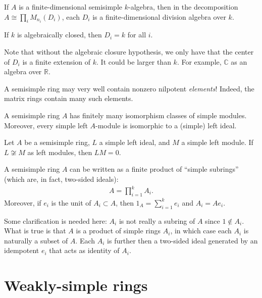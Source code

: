 \documentclass[12pt]{article}
\begin{document}
\begin{thm}
	If $A$ is a finite-dimensional semisimple $k$-algebra, 
	then in the decomposition $A \cong \prod_{i} M_{n_{i}}(D_{i})$, 
	each $D_{i}$ is a finite-dimensional division algebra over $k$.

	If $k$ is algebraically closed, then $D_{i} = k$ for all $i$.
\end{thm}
Note that without the algebraic closure hypothesis, we only have that the center of $D_{i}$ is a finite extension of $k$. 
It could be larger than $k$. 
For example, $\mathbb{C}$ as an algebra over $\mathbb{R}$.

\begin{rem}
	A semisimple ring may very well contain nonzero nilpotent \emph{elements}! 
	Indeed, the matrix rings contain many such elements.
\end{rem}

\begin{thm} \label{thm:semisimple-finitely-many-simples}
	A semisimple ring $A$ has finitely many isomorphism classes of simple modules. 
	Moreover, every simple left $A$-module is isomorphic to a (simple) left ideal.
\end{thm}

\begin{thm}
	Let $A$ be a semisimple ring, $L$ a simple left ideal, and $M$ a simple left module. 
	If $L \not\cong M$ as left modules, then $LM = 0$.
\end{thm}

\begin{thm}
	A semisimple ring $A$ can be written as a finite product of ``simple subrings'' (which are, in fact, two-sided ideals):
	\begin{align*} 
		A = \prod_{i = 1}^{k} A_{i}.
	\end{align*}
	Moreover, if $e_{i}$ is the unit of $A_{i} \subset A$, then $1_{A} = \sum_{i = 1}^{k} e_{i}$ and $A_{i} = A e_{i}$.
\end{thm}
Some clarification is needed here: $A_{i}$ is not really a subring of $A$ since $1 \notin A_{i}$. \newline
What is true is that $A$ is a product of simple rings $A_{i}$, in which case each $A_{i}$ is naturally a subset of $A$. 
Each $A_{i}$ is further then a two-sided ideal generated by an idempotent $e_{i}$ that acts as identity of $A_{i}$.

\section{Weakly-simple rings}
\end{document}
